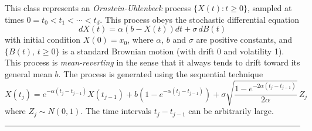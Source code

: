 
This class represents an \emph{Ornstein-Uhlenbeck} process
 $\{X(t) : t \geq 0 \}$, sampled at times $0 = t_0 < t_1 < \cdots < t_d$.
This process obeys the stochastic differential equation
\begin{equation}
   dX(t) = \alpha(b - X(t)) dt + \sigma\, dB(t)
                                               \label{eq:ornstein}
\end{equation}
with initial condition $X(0)= x_0$, 
where $\alpha$, $b$ and $\sigma$ are positive constants,
and $\{B(t),\, t\ge 0\}$ is a standard Brownian motion
(with drift 0 and volatility 1).
This process is \emph{mean-reverting} in the sense that it always tends to
drift toward its general mean $b$.
The process is generated using the sequential technique \cite[p. 110]{fGLA04a}
\begin{equation}
   X(t_j) = e^{-\alpha(t_j - t_{j-1})} X(t_{j-1}) +
            b\left(1 - e^{-\alpha(t_j - t_{j-1})}\right) +
      \sigma \sqrt{\frac{1 - e^{-2\alpha(t_j - t_{j-1})}}{2\alpha}}\, Z_j
                                    \label{eq:ornstein-seq}
\end{equation}
where $Z_j \sim {N}(0,1)$. The time intervals $t_j - t_{j-1}$
can be arbitrarily large.

\bigskip\hrule\bigskip

